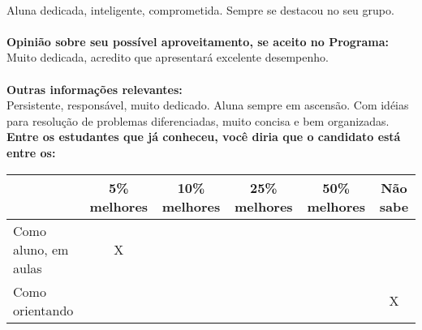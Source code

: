 \documentclass[11pt]{article}
\begin{document}
\\Aluna dedicada, inteligente, comprometida. Sempre se destacou no seu grupo.\\
\\
\textbf{Opinião sobre seu possível aproveitamento, se aceito no Programa:}
\\Muito dedicada, acredito que apresentará excelente desempenho.\\ 
\\
\textbf{Outras informações relevantes:} \\Persistente, responsável, muito dedicado. Aluna sempre em ascensão. Com idéias para resolução de problemas diferenciadas, muito concisa e bem organizadas.
\\[0.3cm]
\textbf{Entre os estudantes que já conheceu, você diria que o candidato está entre os:}
\\
\begin{tabular}{|l|c|c|c|c|c|}
\hline
 & 5\% melhores & 10\% melhores & 25\% melhores & 50\% melhores & Não sabe \\
\hline
Como aluno, em aulas & X &  &  &  & \\
\hline
Como orientando &  &  &  &  & X\\
\hline
\end{tabular}
\end{document}
